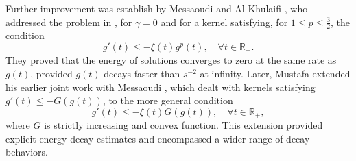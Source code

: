 \documentclass[11pt]{article}
\numberwithin{equation}{section}
\begin{document}
Further improvement was establish by Messaoudi and Al-Khulaifi \cite{MessaoudiWaled}, who addressed the problem in \cite{CavalcantiDS}, for $\gamma =0$ and for a kernel satisfying, for $1\leq p\leq \frac{3}{2}$, the condition
\[
g'(t) \leq -\xi(t) g^p(t), \quad \forall t \in \mathbb{R}_{+}.
\]
They proved that the energy of solutions converges to zero at the same rate as $g(t)$, provided $g(t)$ decays faster than $s^{-2}$ at infinity. Later, Mustafa \cite{MM181} extended his earlier joint work with Messaoudi \cite{MM}, which dealt with kernels satisfying $g'(t) \leq -G(g(t))$, to the more general condition $$g'(t) \leq -\xi(t) G(g(t)), \quad \forall t \in \mathbb{R}_{+},$$ where $G$ is strictly increasing and convex function. This extension provided explicit energy decay estimates and encompassed a wider range of decay behaviors.
\end{document}
